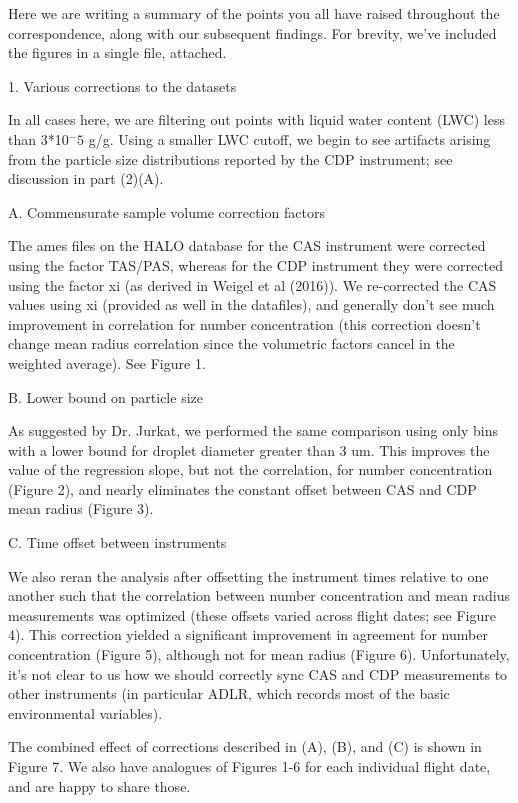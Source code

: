 \documentclass{article}
\begin{document}
\begin{itemize}
{Here we are writing a summary of the points you all have raised throughout the correspondence, along with our subsequent findings. For brevity, we've included the figures in a single file, attached.

1. Various corrections to the datasets

In all cases here, we are filtering out points with liquid water content (LWC) less than 3*10$^-5$ g/g. Using a smaller LWC cutoff, we begin to see artifacts arising from the particle size distributions reported by the CDP instrument; see discussion in part (2)(A).

A. Commensurate sample volume correction factors

The ames files on the HALO database for the CAS instrument were corrected using the factor TAS/PAS, whereas for the CDP instrument they were corrected using the factor xi (as derived in Weigel et al (2016)). We re-corrected the CAS values using xi (provided as well in the datafiles), and generally don't see much improvement in correlation for number concentration (this correction doesn't change mean radius correlation since the volumetric factors cancel in the weighted average). See Figure 1.

B. Lower bound on particle size

As suggested by Dr. Jurkat, we performed the same comparison using only bins with a lower bound for droplet diameter greater than 3 um. This improves the value of the regression slope, but not the correlation, for number concentration (Figure 2), and nearly eliminates the constant offset between CAS and CDP mean radius (Figure 3).

C. Time offset between instruments

We also reran the analysis after offsetting the instrument times relative to one another such that the correlation between number concentration and mean radius measurements was optimized (these offsets varied across flight dates; see Figure 4). This correction yielded a significant improvement in agreement for number concentration (Figure 5), although not for mean radius (Figure 6).  Unfortunately, it's not clear to us how we should correctly sync CAS and CDP measurements to other instruments (in particular ADLR, which records most of the basic environmental variables).

The combined effect of corrections described in (A), (B), and (C) is shown in Figure 7. We also have analogues of Figures 1-6 for each individual flight date, and are happy to share those.

}
\end{itemize}
\end{document}
